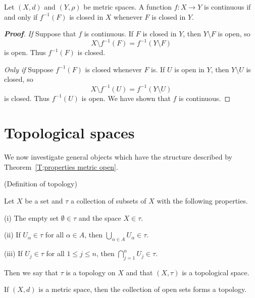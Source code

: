 \begin{theorem}\label{T;metric continuous closed}
Let $(X,d)$ and $(Y,\rho)$ be metric spaces.
A function $f:X\rightarrow Y$ is continuous if and only
if $f^{-1}(F)$ is closed in $X$ whenever $F$ is closed in $Y$.
\end{theorem}
\begin{proof}[\bf Proof] \emph{If} Suppose that
$f$ is continuous. If $F$ is closed in $Y$,
then $Y\setminus F$
is open, so 
\[X\setminus f^{-1}(F)=f^{-1}(Y\setminus F)\]
is open. Thus $f^{-1}(F)$ is closed.

\emph{Only if} Suppose $f^{-1}(F)$ is closed whenever $F$ is.
If $U$ is open in $Y$,
then $Y\setminus U$
is closed, so 
\[X\setminus f^{-1}(U)=f^{-1}(Y\setminus U)\]
is closed. Thus $f^{-1}(U)$ is open.
We have shown that $f$ is continuous.
\end{proof}  















\section{Topological spaces} 

We now investigate general objects which have the structure described by Theorem~\ref{T;properties metric open}.

(Definition of topology)

\begin{definition}\label{D;topology}
Let $X$ be a set and $\tau$ a collection of subsets of $X$ 
with the following properties.

(i) The empty set $\emptyset\in \tau$ and the space $X\in\tau$.

(ii) If $U_{\alpha}\in\tau$ for all $\alpha\in A$, then
$\bigcup_{\alpha\in A} U_{\alpha}\in\tau$.

(iii) If $U_{j}\in\tau$ for all $1\leq j\leq n$, then
$\bigcap_{j=1}^{n} U_{j}\in\tau$.

Then we say that $\tau$ is a topology on $X$ and
that $(X,\tau)$ is a topological space. 
\end{definition}

\begin{theorem}\label{T;metric topology}
If $(X,d)$ is a metric space, then the collection of open sets forms a topology.
\end{theorem}

